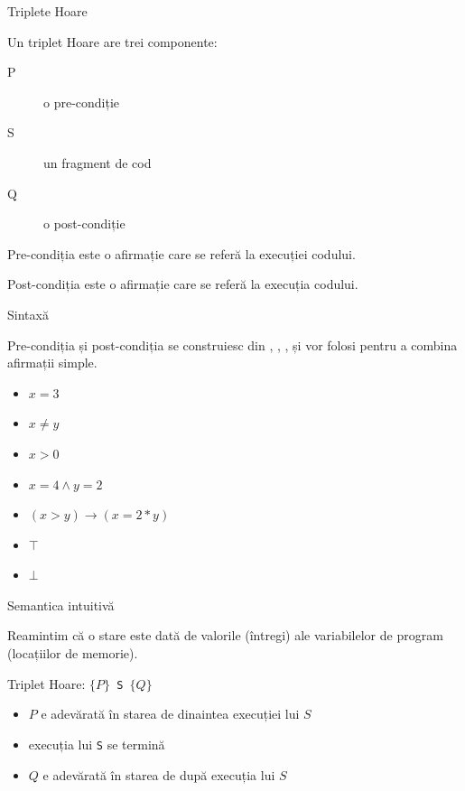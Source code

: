 \begin{frame}{Triplete Hoare}

Un \alert{triplet Hoare}   are trei componente:
\begin{description}
	\item[P] o \alert{pre-condiție}
	\item[S] un \alert{fragment de cod}
	\item[Q] o \alert{post-condiție}
\end{description}

\alert{Pre-condiția} este o afirmație care se referă la  execuției codului.

\alert{Post-condiția} este o afirmație care se referă la  execuția codului.

\end{frame}

\begin{frame}{Sintaxă}

\alert{Pre-condiția} și \alert{post-condiția} se construiesc din , , , și vor folosi  pentru a combina afirmații simple.

\begin{example}
\begin{itemize}
	\item $x = 3$
	\item $x \neq y$
	\item $x > 0$
	\item $x = 4 \wedge y = 2$
	\item $(x > y) \to (x = 2 * y)$
	\item $\top$
	\item $\bot$
\end{itemize}
\end{example}

\end{frame}

\begin{frame}{Semantica intuitivă}

Reamintim că o \alert{stare} este dată de valorile (întregi) ale variabilelor de program (locațiilor de memorie).

\medskip \pause
\alert{Triplet Hoare:} $\{P\}$\texttt{ S }$\{Q\}$
\begin{itemize}
	\item {} $P$ e adevărată în starea de dinaintea execuției lui $S$
	\item {}  execuția lui \texttt{S} se termină
	\item {} $Q$ e adevărată în starea de după execuția lui $S$
\end{itemize}


\end{frame}

